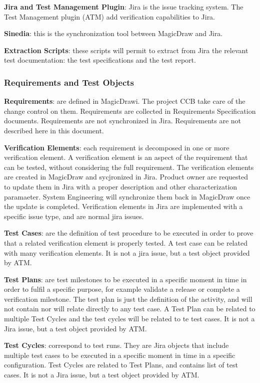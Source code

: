 {\bf Jira and Test Management Plugin}: Jira is the issue tracking system. The Test Management plugin (ATM) add verification capabilities to Jira.

{\bf Sinedia}: this is the synchronization tool between MagicDraw and Jira.

{\bf Extraction Scripts}: these scripts will permit to extract from Jira the relevant test documentation: the test specifications and the test report.


\subsubsection{Requirements and Test Objects}

{\bf Requirements}: are defined in MagicDrawi. The project CCB take care of the change control on them.
Requirements are collected in Requirements Specification documents.
Requirements are not synchronized in Jira.
Requirements are not described here in this document.

{\bf Verification Elements}: each requirement is decomposed in one or more verification element. A verification element is an aspect of the requirement that can be tested, without considering the full requirement. 
The verification elements are created in MagicDraw and sycjronized in Jira. 
Product owner are requested to update them in Jira with a proper description and other characterization paramaeter.
System Engineering will synchronize them back in MagicDraw once the update is completed.
Verification elements in Jira are implemented with a specific issue type, and are normal jira issues.

{\bf Test Cases}: are the definition of test procedure to be executed in order to prove that a related verification element is properly tested. A test case can be related with many verification elements. It is not a jira issue, but a test object provided by ATM.

{\bf Test Plans}: are test milestones to be executed in a specific moment in time in order to fulfil a specific purpose, for example validate a release or complete a verification milestone. 
The test plan is just the definition of the activity, and will not contain nor will relate directly to any test case. 
A Test Plan can be related to multiple Test Cycles and the test cycles will be related to te test cases. 
It is not a Jira issue, but a test object provided by ATM.

{\bf Test Cycles}: correspond to test runs. They are Jira objects that include multiple test cases to be executed in a specific moment in time in a specific configuration. Test Cycles are related to Test Plans, and contains list of test cases. 
It is not a Jira issue, but a test object provided by ATM.

